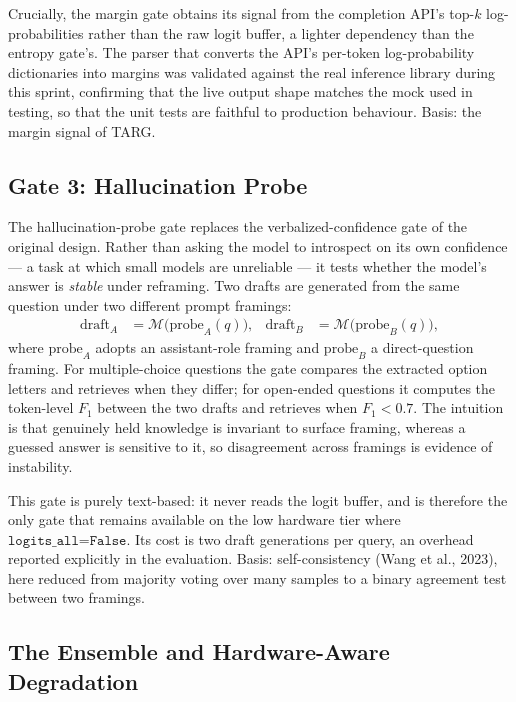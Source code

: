 Crucially, the margin gate obtains its signal from the completion API's
top-$k$ log-probabilities rather than the raw logit buffer, a lighter
dependency than the entropy gate's. The parser that converts the API's
per-token log-probability dictionaries into margins was validated against the
real inference library during this sprint, confirming that the live output
shape matches the mock used in testing, so that the unit tests are faithful to
production behaviour. Basis: the margin signal of TARG.

\subsection{Gate 3: Hallucination Probe}
\label{sec:gate-probe}

The hallucination-probe gate replaces the verbalized-confidence gate of the
original design. Rather than asking the model to introspect on its own
confidence --- a task at which small models are unreliable --- it tests whether
the model's answer is \emph{stable} under reframing. Two drafts are generated
from the same question under two different prompt framings:
\begin{align*}
  \text{draft}_A &= \mathcal{M}\bigl(\text{probe}_A(q)\bigr), &
  \text{draft}_B &= \mathcal{M}\bigl(\text{probe}_B(q)\bigr),
\end{align*}
where $\text{probe}_A$ adopts an assistant-role framing and $\text{probe}_B$ a
direct-question framing. For multiple-choice questions the gate compares the
extracted option letters and retrieves when they differ; for open-ended
questions it computes the token-level $F_1$ between the two drafts and
retrieves when $F_1 < 0.7$. The intuition is that genuinely held knowledge is
invariant to surface framing, whereas a guessed answer is sensitive to it, so
disagreement across framings is evidence of instability.

This gate is purely text-based: it never reads the logit buffer, and is
therefore the only gate that remains available on the low hardware tier where
$\texttt{logits\_all=False}$. Its cost is two draft generations per query, an
overhead reported explicitly in the evaluation. Basis: self-consistency (Wang
et al., 2023), here reduced from majority voting over many samples to a binary
agreement test between two framings.

\subsection{The Ensemble and Hardware-Aware Degradation}
\label{sec:gate-ensemble}

